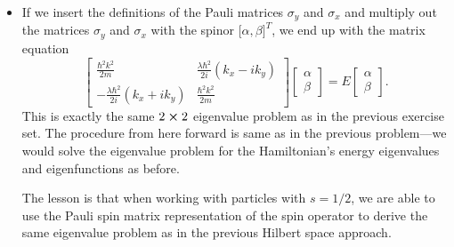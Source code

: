 \documentclass[11pt, a4paper]{article}
\newcommand{\Ham}{Hamiltonian\xspace}
\begin{document}
\begin{itemize}
	\item If we insert the definitions of the Pauli matrices $ \sigma_{y} $ and $ \sigma_{x} $ and multiply out the matrices $ \sigma_{y} $ and $ \sigma_{x} $ with the spinor $ \big[\alpha, \beta\big]^{T} $, we end up with the matrix equation
	\begin{equation*}
		\begin{bmatrix}
			\frac{\hbar^{2}k^{2}}{2m} & \frac{\lambda \hbar^{2}}{2i}(k_{x} - ik_{y})\\
			-\frac{\lambda \hbar^{2}}{2i}(k_{x} + ik_{y}) & \frac{\hbar^{2}k^{2}}{2m}
		\end{bmatrix}
		\begin{bmatrix}
			\alpha\\
			\beta
		\end{bmatrix}
		= 
		E
		\begin{bmatrix}
			\alpha\\
			\beta
		\end{bmatrix}.
	\end{equation*}
	This is exactly the same $ 2 \cross 2 $ eigenvalue problem as in the previous exercise set. The procedure from here forward is same as in the previous problem---we would solve the eigenvalue problem for the \Ham's energy eigenvalues and eigenfunctions as before.
	
	The lesson is that when working with particles with $ s = 1/2 $, we are able to use the Pauli spin matrix representation of the spin operator to derive the same eigenvalue problem as in the previous Hilbert space approach.
\end{itemize}
\end{document}
